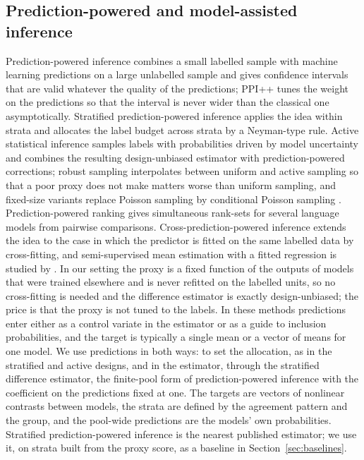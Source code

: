 \subsection{Prediction-powered and model-assisted inference}

Prediction-powered inference \citep{angelopoulos2023ppi} combines a small labelled sample with machine learning predictions on a large unlabelled sample and gives confidence intervals that are valid whatever the quality of the predictions; PPI++ \citep{angelopoulos2026ppipp} tunes the weight on the predictions so that the interval is never wider than the classical one asymptotically. Stratified prediction-powered inference \citep{fisch2024stratppi} applies the idea within strata and allocates the label budget across strata by a Neyman-type rule. Active statistical inference \citep{zrnic2024active} samples labels with probabilities driven by model uncertainty and combines the resulting design-unbiased estimator with prediction-powered corrections; robust sampling \citep{li2025robust} interpolates between uniform and active sampling so that a poor proxy does not make matters worse than uniform sampling, and fixed-size variants replace Poisson sampling by conditional Poisson sampling \citep{skalnes2026}. Prediction-powered ranking \citep{chatzi2024} gives simultaneous rank-sets for several language models from pairwise comparisons. Cross-prediction-powered inference \citep{zrnic2024cross} extends the idea to the case in which the predictor is fitted on the same labelled data by cross-fitting, and semi-supervised mean estimation with a fitted regression is studied by \citet{zhang2019semisupervised}. In our setting the proxy is a fixed function of the outputs of models that were trained elsewhere and is never refitted on the labelled units, so no cross-fitting is needed and the difference estimator is exactly design-unbiased; the price is that the proxy is not tuned to the labels. In these methods predictions enter either as a control variate in the estimator or as a guide to inclusion probabilities, and the target is typically a single mean or a vector of means for one model. We use predictions in both ways: to set the allocation, as in the stratified and active designs, and in the estimator, through the stratified difference estimator, the finite-pool form of prediction-powered inference with the coefficient on the predictions fixed at one. The targets are vectors of nonlinear contrasts between models, the strata are defined by the agreement pattern and the group, and the pool-wide predictions are the models' own probabilities. Stratified prediction-powered inference is the nearest published estimator; we use it, on strata built from the proxy score, as a baseline in Section~\ref{sec:baselines}.

